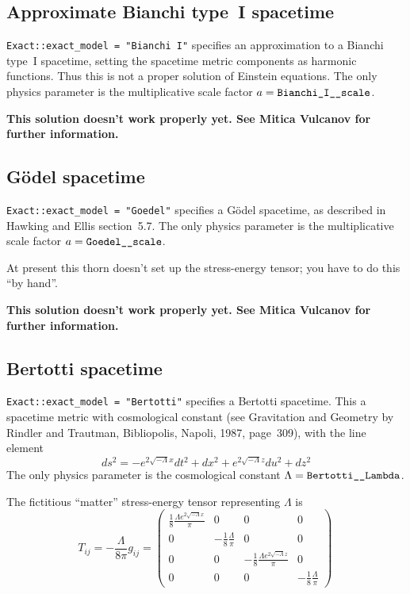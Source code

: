 
\subsection{Approximate Bianchi type~I spacetime}

\verb|Exact::exact_model = "Bianchi I"| specifies an approximation to
a Bianchi type~I spacetime, setting the spacetime metric components
as harmonic functions. Thus this is not a proper solution of Einstein
equations.  The only physics parameter is the multiplicative scale
factor $a = \verb|Bianchi_I__scale|$.

{\bf This solution doesn't work properly yet.  See Mitica Vulcanov for
further information.}


\subsection{G\"{o}del spacetime}

\verb|Exact::exact_model = "Goedel"| specifies a G\"{o}del spacetime,
as described in Hawking and Ellis section~5.7.  The only physics parameter
is the multiplicative scale factor $a = \verb|Goedel__scale|$.

At present this thorn doesn't set up the stress-energy tensor;
you have to do this ``by hand''.

{\bf This solution doesn't work properly yet.  See Mitica Vulcanov for
further information.}


\subsection{Bertotti spacetime}

\verb|Exact::exact_model = "Bertotti"| specifies a Bertotti spacetime.
This a spacetime metric with cosmological constant (see Gravitation
and Geometry by Rindler and Trautman, Bibliopolis, Napoli, 1987,
page~309), with the line element
\begin{equation}
ds^2 = -e^{2\sqrt{-\Lambda}x}dt^2 +dx^2 +  e^{2\sqrt{-\Lambda}z}du^2 + dz^2
\end{equation}
The only physics parameter is the cosmological constant
$\Lambda = \verb|Bertotti__Lambda|$.

The fictitious ``matter'' stress-energy tensor representing $\Lambda$ is
\begin{equation}
T_{ij}= - \frac{\Lambda}{8 \pi} g_{ij} = \left ( \begin{array}{cccc}
\frac{1}{8}\frac{\Lambda e^{2\sqrt{-\Lambda} x}}{\pi} & 0 & 0 & 0\\
0 & -\frac{1}{8}\frac{\Lambda}{\pi }& 0 & 0\\
0 & 0 &-\frac{1}{8}\frac{\Lambda e^{2\sqrt{-\Lambda}z}}{\pi }&  0\\
0 & 0 & 0 & -\frac{1}{8}\frac{\Lambda}{\pi}\end{array}\right ) \, 
\end{equation}

